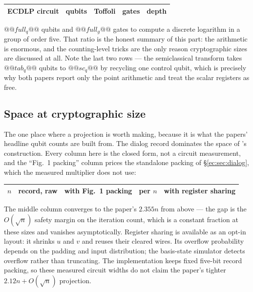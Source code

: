 \begin{center}\small
\begin{tabular}{@{}lrrrr@{}}
\toprule
ECDLP circuit & qubits & Toffoli & gates & depth\\
\midrule
\bottomrule
\end{tabular}
\end{center}

\noindent
$@@full_q@@$ qubits and $@@full_g@@$ gates to compute a discrete logarithm in a group of order
five. That ratio is the honest summary of this part: the arithmetic is enormous, and the
counting-level tricks are the only reason cryptographic sizes are discussed at all. Note the last
two rows --- the semiclassical transform takes $@@tab_q@@$ qubits to $@@sc_q@@$ by recycling one
control qubit, which is precisely why both papers report only the point arithmetic and treat the
scalar registers as free.

\subsection{Space at cryptographic size}\label{ec:sec:space}

The one place where a projection is worth making, because it is what the papers' headline qubit
counts are built from. The dialog record dominates the space of \cite{ec:schrott26}'s construction.
Every column here is the  closed form, not a circuit measurement, and the
``Fig.~1 packing'' column prices the standalone packing of \S\ref{ec:sec:dialog}, which the measured
multiplier does not use:

\begin{center}\small
\begin{tabular}{@{}rrrrr@{}}
\toprule
$n$ & record, raw & with Fig.~1 packing & per $n$ & with register sharing\\
\midrule
\bottomrule
\end{tabular}
\end{center}

\noindent
The middle column converges to the paper's $2.355n$ from above --- the gap is the $O(\sqrt n)$
safety margin on the iteration count, which is a constant fraction at these sizes and vanishes
asymptotically. Register sharing is available as an opt-in layout: it shrinks $u$ and $v$ and reuses
their cleared wires. Its overflow probability depends on the padding and input distribution; the
basis-state simulator detects overflow rather than truncating. The implementation keeps fixed
five-bit record packing, so these measured circuit widths do not claim the paper's tighter
$2.12n+O(\sqrt n)$ projection.

